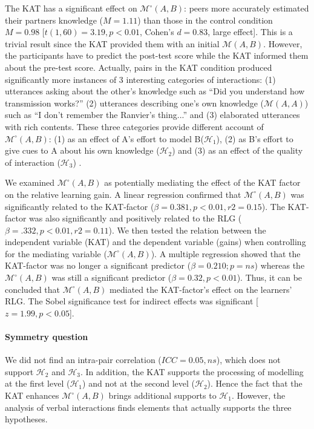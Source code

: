 \documentclass[natbib]{svjour3}
\newcommand{\A}{A\xspace}
\newcommand{\B}{B\xspace}
\newcommand{\gmodel}[2]{{$\mathcal{M}(#1, #2)$}}
\newcommand{\gModel}[2]{{$\mathcal{M}^{\circ}(#1, #2)$}}
\begin{document}
The KAT has a significant effect on \gModel{A}{B}: peers more accurately
estimated their partners knowledge ($M = 1.11$) than those in the control
condition $M = 0.98$ [$t(1, 60) = 3.19, p < 0.01$, Cohen's $d = 0.83$, large
effect]. This is a trivial result since the KAT provided them with an initial
\gmodel{A}{B}. However, the participants have to predict the post-test score while the
KAT informed them about the pre-test score. Actually, pairs in the KAT condition
produced significantly more instances of 3 interesting categories of
interactions: (1) utterances asking about the other's knowledge such as ``Did
you understand how transmission works?'' (2) utterances describing one's own
knowledge (\gmodel{A}{A}) such as ``I don't remember the Ranvier's thing...''
and (3) elaborated utterances with rich contents. These three categories provide
different account of \gModel{A}{B}: (1) as an effect of \A's effort to model
\B  ($\mathcal{H}_{1}$), (2) as \B's effort to give cues to \A about his own
knowledge ($\mathcal{H}_{2}$) and (3) as an effect of the quality of
interaction ($\mathcal{H}_{3}$) .

We examined \gModel{A}{B} as potentially mediating the effect of the KAT factor
on the relative learning gain. A linear regression confirmed that \gModel{A}{B}
was significantly related to the KAT-factor ($\beta= 0.381, p < 0.01, r2 = 0.15$).
The KAT-factor was also significantly and positively related to the RLG ($\beta=
.332, p < 0.01, r2 = 0.11$). We then tested the relation between the independent
variable (KAT) and the dependent variable (gains) when controlling for the
mediating variable (\gModel{A}{B}). A multiple regression showed that the
KAT-factor was no longer a significant predictor ($\beta= 0.210; p = ns$) whereas
the \gModel{A}{B} was still a significant predictor ($\beta= 0.32, p < 0.01$).
Thus, it can be concluded that \gModel{A}{B} mediated the KAT-factor's effect on
the learners' RLG. The Sobel significance test for indirect effects was
significant [$z = 1.99, p < 0.05$]. 

\paragraph{Symmetry question} We did not find an intra-pair correlation ($ICC =
0.05, ns$), which does not support $\mathcal{H}_{2}$ and $\mathcal{H}_{3}$. In
addition, the KAT supports the processing of modelling at the first level
($\mathcal{H}_{1}$) and not at the second level ($\mathcal{H}_{2}$). Hence the
fact that the KAT enhances  \gModel{A}{B}  brings additional supports to
$\mathcal{H}_{1}$. However, the analysis of verbal interactions finds elements
that actually supports the three hypotheses.
\end{document}
